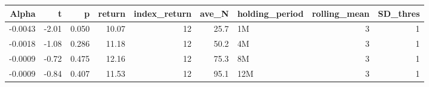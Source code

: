 \begin{table}[ht]
\centering
\begin{tabular}{rrrrrrlrr}
  \hline
Alpha & t & p & return & index\_return & ave\_N & holding\_period & rolling\_mean & SD\_thres \\ 
  \hline
-0.0043 & -2.01 & 0.050 & 10.07 & 12 & 25.7 & 1M &  3 &  1 \\ 
  -0.0018 & -1.08 & 0.286 & 11.18 & 12 & 50.2 & 4M &  3 &  1 \\ 
  -0.0009 & -0.72 & 0.475 & 12.16 & 12 & 75.3 & 8M &  3 &  1 \\ 
  -0.0009 & -0.84 & 0.407 & 11.53 & 12 & 95.1 & 12M &  3 &  1 \\ 
   \hline
\end{tabular}
\end{table}

